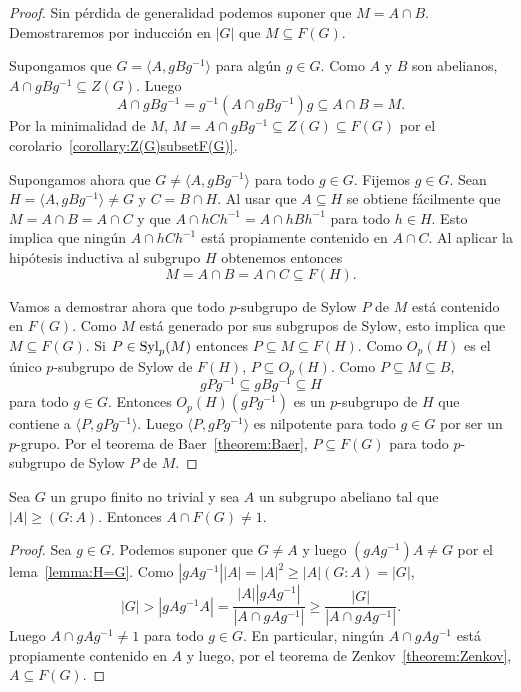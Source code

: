 \begin{proof}
	Sin pérdida de generalidad podemos suponer que $M=A\cap B$. Demostraremos
	por inducción en $|G|$ que $M\subseteq F(G)$.

	Supongamos que $G=\langle A,gBg^{-1}\rangle$ para algún $g\in G$. Como $A$
	y $B$ son abelianos, $A\cap gBg^{-1}\subseteq Z(G)$. Luego
	\[
		A\cap gBg^{-1}=g^{-1}(A\cap gBg^{-1})g\subseteq A\cap B=M.
	\]
	Por la minimalidad de $M$, $M=A\cap gBg^{-1}\subseteq Z(G)\subseteq F(G)$
	por el corolario~\ref{corollary:Z(G)subsetF(G)}.

	Supongamos ahora que $G\ne \langle A,gBg^{-1}\rangle$ para todo $g\in G$.
	Fijemos $g\in G$. Sean  $H=\langle A,gBg^{-1}\rangle\ne G$ y $C=B\cap H$.
	Al usar que $A\subseteq H$ se obtiene fácilmente que 
	$M=A\cap B=A\cap C$ y que 
	$A\cap hCh^{-1}=A\cap hBh^{-1}$
	para todo $h\in H$. Esto implica que ningún
	$A\cap hCh^{-1}$ está propiamente contenido en $A\cap C$. Al aplicar la
	hipótesis inductiva al subgrupo $H$ obtenemos entonces  
	\[
		M=A\cap B=A\cap C\subseteq F(H).
	\]

	Vamos a demostrar ahora que todo $p$-subgrupo de Sylow $P$ de $M$ está
	contenido en $F(G)$. Como $M$ está generado por sus subgrupos de Sylow,
	esto implica que $M\subseteq F(G)$.
	Si $P\in\mathrm{Syl}_p(M)$ entonces $P\subseteq M\subseteq F(H)$. Como $O_p(H)$ es
	el único $p$-subgrupo de Sylow de $F(H)$, $P\subseteq O_p(H)$. Como
	$P\subseteq M\subseteq B$, 
	\[
	gPg^{-1}\subseteq gBg^{-1}\subseteq H
	\]
	para todo $g\in G$. Entonces $O_p(H)(gPg^{-1})$ es un $p$-subgrupo de $H$ que
	contiene a $\langle P,gPg^{-1}\rangle$. Luego $\langle P,gPg^{-1}\rangle$
	es nilpotente para todo $g\in G$ por ser un $p$-grupo. Por el teorema de
	Baer~\ref{theorem:Baer}, $P\subseteq F(G)$ para todo $p$-subgrupo de Sylow $P$ de $M$.
\end{proof}

\begin{corollary}
	\label{corollary:Zenkov}
	Sea $G$ un grupo finito no trivial y sea $A$ un subgrupo abeliano tal que
	$|A|\geq(G:A)$. Entonces $A\cap F(G)\ne1$.
\end{corollary}

\begin{proof}
	Sea $g\in G$. Podemos suponer que $G\ne A$ y luego $(gAg^{-1})A\ne G$ por
	el lema~\ref{lemma:H=G}. Como 
	$|gAg^{-1}||A|=|A|^2\geq |A|(G:A)=|G|$, 
	\[
		|G|>|gAg^{-1}A|
		=\frac{|A||gAg^{-1}|}{|A\cap gAg^{-1}|}
		\geq \frac{|G|}{|A\cap gAg^{-1}|}.
	\]
	Luego $A\cap gAg^{-1}\ne 1$ para todo $g\in G$. En particular, ningún
	$A\cap gAg^{-1}$ está propiamente contenido en $A$ y luego, por el teorema
	de Zenkov~\ref{theorem:Zenkov}, $A\subseteq F(G)$.
\end{proof}

